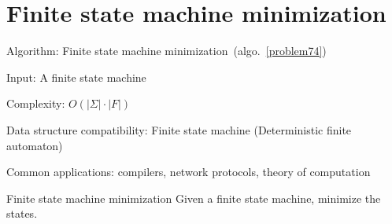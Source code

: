 \documentclass{article}
\begin{document}
\fi

%
%

\def\pbname{Finite state machine minimization} %

\section{\pbname} 

\begin{overview}
\item [Algorithm:] Finite state machine minimization~(algo.~\ref{problem74}) 
\item [Input:] A finite state machine
\item [Complexity:] $O(|\Sigma|\cdot |F|)$
\item [Data structure compatibility:] Finite state machine (Deterministic finite automaton)
\item [Common applications:] compilers, network protocols, theory of computation
\end{overview}



\begin{problem}{\pbname}
	Given a finite state machine, minimize the states.
\end{problem}
\end{document}
